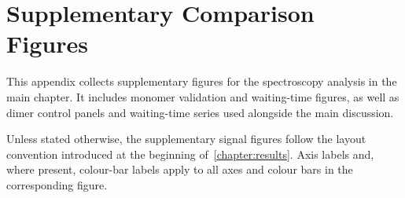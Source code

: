 \providecommand{\dimerFigFourWaitZeroPaperTimePath}{\detokenize{figures/svgs/dimer_essential_results/15_152608_dimer_fig4_T000_paper_eqs/figures/time_all_signals_real_imag_abs_dimer_fig4_T000_paper_eqs}}
\providecommand{\dimerFigFourWaitSixteenPaperTimePath}{\detokenize{figures/svgs/dimer_essential_results/15_152639_dimer_fig4_T016_paper_eqs/figures/time_all_signals_real_imag_abs_dimer_fig4_T016_paper_eqs}}
\providecommand{\dimerFigFourWaitThirtyPaperTimePath}{\detokenize{figures/svgs/dimer_essential_results/15_152713_dimer_fig4_T030_paper_eqs/figures/time_all_signals_real_imag_abs_dimer_fig4_T030_paper_eqs}}
\providecommand{\dimerFigFourWaitFortySixPaperTimePath}{\detokenize{figures/svgs/dimer_essential_results/15_152741_dimer_fig4_T046_paper_eqs/figures/time_all_signals_real_imag_abs_dimer_fig4_T046_paper_eqs}}
\providecommand{\dimerFigFourWaitSixtyTwoPaperTimePath}{\detokenize{figures/svgs/dimer_essential_results/15_152817_dimer_fig4_T062_paper_eqs/figures/time_all_signals_real_imag_abs_dimer_fig4_T062_paper_eqs}}
\providecommand{\dimerFigFourWaitOneOhEightPaperTimePath}{\detokenize{figures/svgs/dimer_essential_results/15_162222_dimer_fig4_T108_paper_eqs/figures/time_all_signals_real_imag_abs_dimer_fig4_T108_paper_eqs}}
\providecommand{\dimerFigFourWaitOneFortyPaperTimePath}{\detokenize{figures/svgs/dimer_essential_results/15_162248_dimer_fig4_T140_paper_eqs/figures/time_all_signals_real_imag_abs_dimer_fig4_T140_paper_eqs}}
\providecommand{\dimerFigFourWaitThreeTenPaperTimePath}{\detokenize{figures/svgs/dimer_essential_results/15_162315_dimer_fig4_T310_paper_eqs/figures/time_all_signals_real_imag_abs_dimer_fig4_T310_paper_eqs}}


\chapter{Supplementary Comparison Figures}
\label{app:supplementary_comparison_figures}

This appendix collects supplementary figures for the spectroscopy analysis in
the main chapter. It includes monomer validation and waiting-time figures, as
well as dimer control panels and waiting-time series used alongside the main
discussion.

Unless stated otherwise, the supplementary signal figures follow the layout
convention introduced at the beginning of~\autoref{chapter:results}. Axis
labels and, where present, colour-bar labels apply to all axes and colour bars
in the corresponding figure.

